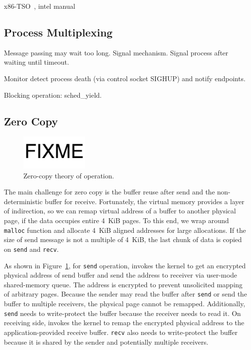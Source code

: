 x86-TSO~\cite{sewell2010x86}, intel manual~\cite{intel-manual}

\subsection{Process Multiplexing}
\label{subsec:epoll}


Message passing may wait too long.
Signal mechanism. Signal process after waiting until timeout.

Monitor detect process death (via control socket SIGHUP) and notify endpoints.

Blocking operation: sched\_yield.


\subsection{Zero Copy}
\label{subsec:zerocopy}

\begin{figure}[t]
	\centering
	\includegraphics[width=0.3\textwidth]{images/fixme}
	\caption{Zero-copy theory of operation.}
	\label{fig:zerocopy}
\end{figure}

The main challenge for zero copy is the buffer reuse after send and the non-deterministic buffer for receive.
Fortunately, the virtual memory provides a layer of indirection, so we can remap virtual address of a buffer to another physical page, if the data occupies entire 4~KiB pages.
To this end, we wrap around \texttt{malloc} function and allocate 4~KiB aligned addresses for large allocations.
If the size of send message is not a multiple of 4~KiB, the last chunk of data is copied on \texttt{send} and \texttt{recv}.

As shown in Figure~\ref{fig:zerocopy}, for \texttt{send} operation, \libipc{} invokes the kernel to get an encrypted physical address of send buffer and send the address to receiver via user-mode shared-memory queue.
The address is encrypted to prevent unsolicited mapping of arbitrary pages.
Because the sender may read the buffer after \texttt{send} or send the buffer to multiple receivers, the physical page cannot be remapped.
Additionally, \texttt{send} needs to write-protect the buffer because the receiver needs to read it.
On receiving side, \libipc{} invokes the kernel to remap the encrypted physical address to the application-provided receive buffer.
\texttt{recv} also needs to write-protect the buffer because it is shared by the sender and potentially multiple receivers.

